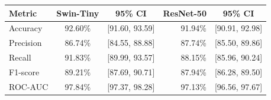 \begin{tabular}{lccrc}
\toprule
Metric & Swin-Tiny & 95\% CI & ResNet-50 & 95\% CI\\
\midrule
Accuracy & 92.60\% & [91.60, 93.59] & 91.94\% & [90.91, 92.98]\\
Precision & 86.74\% & [84.55, 88.88] & 87.74\% & [85.50, 89.86]\\
Recall & 91.83\% & [89.99, 93.57] & 88.15\% & [85.96, 90.24]\\
F1-score & 89.21\% & [87.69, 90.71] & 87.94\% & [86.28, 89.50]\\
ROC-AUC & 97.84\% & [97.37, 98.28] & 97.13\% & [96.56, 97.67]\\
\bottomrule
\end{tabular}